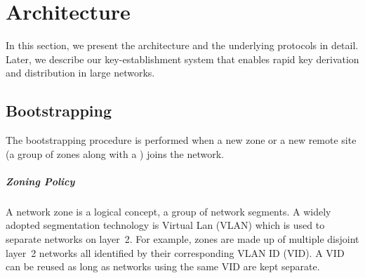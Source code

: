 \chapter{Architecture}
\label{arch}

In this section, we present the \name architecture and the underlying protocols in detail. 
Later, we describe our key-establishment system that enables rapid key derivation 
and distribution in large networks. 

\section{\name Bootstrapping}
\label{sec:bootstrapping}

The bootstrapping procedure is performed when a new zone or a new remote site 
(a group of zones along with a \tp) joins the network. 

\paragraph{Zoning Policy} %
A network zone is a logical concept, a group of network segments. A widely adopted 
segmentation technology is Virtual Lan (VLAN) which is used to separate networks on
layer~2. For example, zones are made up of multiple disjoint layer~2 networks
all identified by their corresponding VLAN ID (VID). A VID can be reused as long
as networks using the same VID are kept separate.

